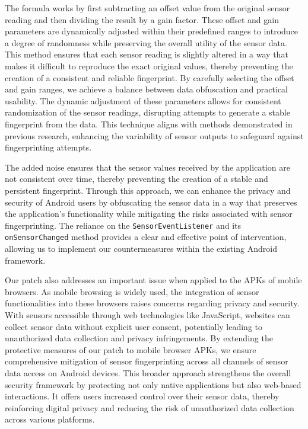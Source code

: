\documentclass[11pt,
  oneside,openany,    %
]{scrreprt}
\begin{document}
The formula works by first subtracting an offset value from the original sensor reading and then dividing the result by a gain factor.
These offset and gain parameters are dynamically adjusted within their predefined ranges to introduce a degree of randomness while preserving the overall utility of the sensor data.
This method ensures that each sensor reading is slightly altered in a way that makes it difficult to reproduce the exact original values, thereby preventing the creation of a consistent and reliable fingerprint.
By carefully selecting the offset and gain ranges, we achieve a balance between data obfuscation and practical usability.
The dynamic adjustment of these parameters allows for consistent randomization of the sensor readings, disrupting attempts to generate a stable fingerprint from the data.
This technique aligns with methods demonstrated in previous research, enhancing the variability of sensor outputs to safeguard against fingerprinting attempts.

The added noise ensures that the sensor values received by the application are not consistent over time, thereby preventing the creation of a stable and persistent fingerprint.
Through this approach, we can enhance the privacy and security of Android users by obfuscating the sensor data in a way that preserves the application's functionality while mitigating the risks associated with sensor fingerprinting.
The reliance on the \verb|SensorEventListener| and its \verb|onSensorChanged| method provides a clear and effective point of intervention, allowing us to implement our countermeasures within the existing Android framework.

Our patch also addresses an important issue when applied to the APKs of mobile browsers.
As mobile browsing is widely used, the integration of sensor functionalities into these browsers raises concerns regarding privacy and security.
With sensors accessible through web technologies like JavaScript, websites can collect sensor data without explicit user consent, potentially leading to unauthorized data collection and privacy infringements.
By extending the protective measures of our patch to mobile browser APKs, we ensure comprehensive mitigation of sensor fingerprinting across all channels of sensor data access on Android devices.
This broader approach strengthens the overall security framework by protecting not only native applications but also web-based interactions.
It offers users increased control over their sensor data, thereby reinforcing digital privacy and reducing the risk of unauthorized data collection across various platforms.
\end{document}
